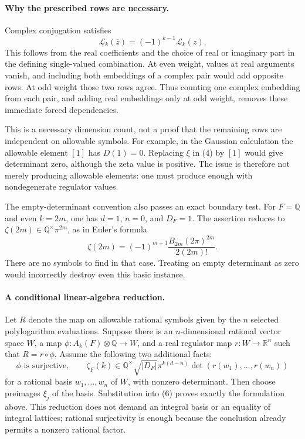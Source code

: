 \documentclass[11pt]{article}
\begin{document}
\paragraph{Why the prescribed rows are necessary.}
Complex conjugation satisfies
\[
 \mathcal L_k(\overline z)=(-1)^{k-1}\mathcal L_k(z).
                                                               \tag{5}
\]
This follows from the real coefficients and the choice of real or imaginary part in the defining single-valued combination. At even weight, values at real arguments vanish, and including both embeddings of a complex pair would add opposite rows. At odd weight those two rows agree. Thus counting one complex embedding from each pair, and adding real embeddings only at odd weight, removes these immediate forced dependencies.

This is a necessary dimension count, not a proof that the remaining rows are independent on allowable symbols. For example, in the Gaussian calculation the allowable element $[1]$ has $D(1)=0$. Replacing $\xi$ in (4) by $[1]$ would give determinant zero, although the zeta value is positive. The issue is therefore not merely producing allowable elements: one must produce enough with nondegenerate regulator values.

The empty-determinant convention also passes an exact boundary test. For $F=\mathbb Q$ and even $k=2m$, one has $d=1$, $n=0$, and $D_F=1$. The assertion reduces to $\zeta(2m)\in\mathbb Q^\times\pi^{2m}$, as in Euler's formula
\[
 \zeta(2m)=(-1)^{m+1}\frac{B_{2m}(2\pi)^{2m}}{2(2m)!}.
\]
There are no symbols to find in that case. Treating an empty determinant as zero would incorrectly destroy even this basic instance.

\paragraph{A conditional linear-algebra reduction.}
Let $R$ denote the map on allowable rational symbols given by the $n$ selected polylogarithm evaluations. Suppose there is an $n$-dimensional rational vector space $W$, a map $\phi:A_k(F)\otimes\mathbb Q\to W$, and a real regulator map $r:W\to\mathbb R^n$ such that $R=r\circ\phi$. Assume the following two additional facts:
\[
 \phi\text{ is surjective},\qquad
 \zeta_F(k)\in\mathbb Q^\times\sqrt{|D_F|}\pi^{k(d-n)}
       \det(r(w_1),\ldots,r(w_n))                           \tag{6}
\]
for a rational basis $w_1,\ldots,w_n$ of $W$, with nonzero determinant. Then choose preimages $\xi_j$ of the basis. Substitution into (6) proves exactly the formulation above. This reduction does not demand an integral basis or an equality of integral lattices; rational surjectivity is enough because the conclusion already permits a nonzero rational factor.
\end{document}
